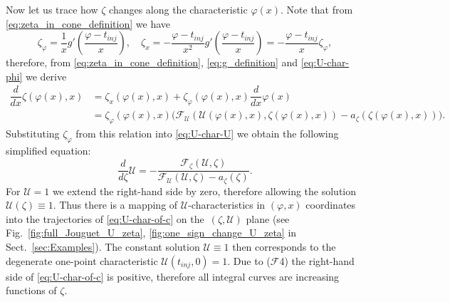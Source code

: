 \documentclass[12pt]{article}
\theoremstyle{definition}
\begin{document}
Now let us trace how $\zeta$ changes along the characteristic $\varphi(x)$.
Note that from \eqref{eq:zeta_in_cone_definition} we have
\begin{equation}\label{eq:zeta_derivatives}
\zeta_\varphi =\dfrac{1}{x} g'\left(\dfrac{\varphi - t_{inj}}{x}\right), \quad  \zeta_x = -\dfrac{\varphi - t_{inj}}{x^2} g'\left(\dfrac{\varphi - t_{inj}}{x}\right) = - \dfrac{\varphi - t_{inj}}{x} \zeta_\varphi,
\end{equation}
therefore, from \eqref{eq:zeta_in_cone_definition}, \eqref{eq:g_definition} and \eqref{eq:U-char-phi} we derive
\begin{equation}
\label{eq:d_zeta_d_x}
\begin{aligned}
\dfrac{d}{dx}\zeta(\varphi(x), x) & = \zeta_x(\varphi(x), x) + \zeta_\varphi(\varphi(x), x) \dfrac{d}{dx}\varphi(x) \\
{} & = \zeta_\varphi(\varphi(x), x) \Big(\mathcal F_{\mathcal U}(\mathcal U(\varphi(x), x), \zeta(\varphi(x), x)) - a_\zeta(\zeta(\varphi(x), x)) \Big).
\end{aligned}
\end{equation}
Substituting $\zeta_\varphi$ from this relation into \eqref{eq:U-char-U} we obtain the following simplified equation:
\begin{equation}
\label{eq:U-char-of-c}
\dfrac{d}{d\zeta} \mathcal U = -\dfrac{\mathcal F_{\zeta}(\mathcal U, \zeta)}{\mathcal F_{\mathcal U}(\mathcal U, \zeta) - a_\zeta(\zeta)}.  
\end{equation}
For $\mathcal U = 1$ we extend the right-hand side by zero, therefore allowing the solution $\mathcal U(\zeta)\equiv 1$. Thus there is a mapping of $\mathcal U$-characteristics in $(\varphi, x)$ coordinates into the trajectories of \eqref{eq:U-char-of-c} on the~$(\zeta, \mathcal U)$ plane (see Fig.~\ref{fig:full_Jouguet_U_zeta}, \ref{fig:one_sign_change_U_zeta} in Sect.~\ref{sec:Examples}). The constant solution $\mathcal U\equiv 1$ then corresponds to the degenerate one-point characteristic $\mathcal U(t_{inj}, 0) = 1$.
Due to ($\mathcal F$4) the right-hand side of \eqref{eq:U-char-of-c} is positive, therefore all integral curves are increasing functions of $\zeta$. 
\end{document}
